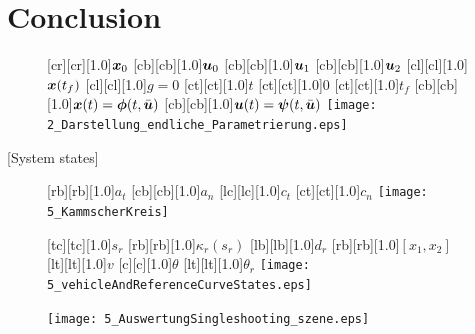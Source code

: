 \section{Conclusion}\label{S:yy}

\begin{figure}[h]
\centering
	[cr][cr][1.0]{$\boldsymbol{x}_0$}
	[cb][cb][1.0]{$\boldsymbol{u}_0$}
	[cb][cb][1.0]{$\boldsymbol{u}_1$}
	[cb][cb][1.0]{$\boldsymbol{u}_2$}
	[cl][cl][1.0]{$\boldsymbol{x}(t_f)$}
	[cl][cl][1.0]{$g=0$}
	[ct][ct][1.0]{$t$}
	[ct][ct][1.0]{$0$}
	[ct][ct][1.0]{$t_f$}
	[cb][cb][1.0]{$\boldsymbol{x}(t) = \boldsymbol{\phi}(t,\bar{\boldsymbol{u}})$}
	[cb][cb][1.0]{$\boldsymbol{u}(t) = \boldsymbol{\psi}(t,\bar{\boldsymbol{u}})$}
 \texttt{[image: 2\_Darstellung\_endliche\_Parametrierung.eps]}
	\label{fig:parametrisierte_nmpc}
\end{figure}
%

 \hspace{1.8cm} [System states]
\begin{figure}[h]%
\centering
\begin{minipage}{0.45\textwidth}%
    [rb][rb][1.0]{$a_t$}
    [cb][cb][1.0]{$a_n$}
    [lc][lc][1.0]{$c_t$}
    [ct][ct][1.0]{$c_n$}
    \texttt{[image: 5\_KammscherKreis]}
    \label{fig:kammscherKreis}
\end{minipage}
\qquad
\begin{minipage}{0.45\textwidth}%
[tc][tc][1.0]{$s_r$}
    [rb][rb][1.0]{$\kappa_r(s_r)$}
    [lb][lb][1.0]{$d_r$}
    [rb][rb][1.0]{$[x_1, x_2]$}
    [lt][lt][1.0]{$v$}
    [c][c][1.0]{$\theta$}
    [lt][lt][1.0]{$\theta_r$}
    \texttt{[image: 5\_vehicleAndReferenceCurveStates.eps]}
    \label{fig:systemStates}
\end{minipage}%
\end{figure}%

\begin{figure}[h]
	\centering
	
	\renewcommand{\matlabtextA}{\scriptsize}
	\texttt{[image: 5\_AuswertungSingleshooting\_szene.eps]}		
    \label{fig:fussgaenger_draufsicht}
\end{figure}
	
